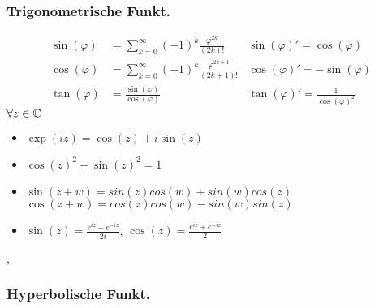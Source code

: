 \subsubsection{Trigonometrische Funkt.}
\begin{align*}
\sin(\varphi)  
& =\sum_{k=0}^{\infty} (-1)^k \frac{\varphi^{2k}}{(2k)!} &\sin(\varphi)' = \cos(\varphi)  \\
\cos(\varphi)  
& = \sum_{k=0}^{\infty} (-1)^k \frac{\varphi^{2k+1}}{(2k+1)!} &\cos(\varphi)' = -\sin(\varphi) \\
\tan(\varphi)  
& = \frac{\sin(\varphi)}{\cos(\varphi)} & \tan(\varphi)' = \frac{1}{\cos(\varphi)^2}
\end{align*}
\Satz $\forall z \in \mathbb{C}$ 
\begin{itemize}
	\item $\exp(iz) = \cos(z) + i\sin(z)$
	\item $\cos(z)^2 + \sin(z)^2 = 1$
	\item $\sin(z+w) = sin(z)cos(w) + sin(w)cos(z)$ \\
		  $\cos(z+w) = cos(z)cos(w) - sin(w)sin(z)$ 
	\item $\sin(z) = \frac{e^{iz}-e^{-iz}}{2i}$, $\cos(z) = \frac{e^{iz}+e^{-iz}}{2}$
\end{itemize}
\sep
\subsubsection{Hyperbolische Funkt.}
\todo
